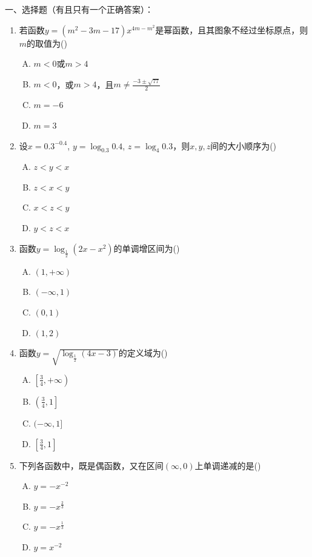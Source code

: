 一、选择题（有且只有一个正确答案）：
\begin{enumerate}
    \item 若函数$y=(m^2-3m-17)x^{4m-m^2}$是幂函数，且其图象不经过坐标原点，则$m$的取值为\hfill (\qquad )
\begin{enumerate}[(A)]
    \item $m<0$或$m>4$
    \item $m<0$，或$m>4$，且$m\ne \frac{-3\pm\sqrt{77}}{2}$
    \item $m=-6$
    \item $m=3$
\end{enumerate}

\item 设$x=0.3^{-0.4}$, $y=\log_{0.3}0.4$, $z=\log_4 0.3$，则$x,y,z$间的大小顺序为\hfill (\qquad )
\begin{multicols}{4}
\begin{enumerate}[(A)]
    \item $z<y<x$
    \item $z<x<y$
    \item $x<z<y$
    \item $y<z<x$
\end{enumerate}
\end{multicols}

\item 函数$y=\log_{\tfrac{1}{2}}(2x-x^2)$的单调增区间为\hfill (\qquad )
\begin{multicols}{4}
\begin{enumerate}[(A)]
    \item $(1,+\infty)$
    \item $(-\infty,1)$
    \item $(0,1)$
    \item $(1,2)$
\end{enumerate}
\end{multicols}

\item 函数$y=\sqrt{\log_{\tfrac{1}{2}}(4x-3)}$的定义域为\hfill (\qquad )
\begin{multicols}{4}
\begin{enumerate}[(A)]
    \item $\left[\frac{3}{4},+\infty\right)$
    \item $\left(\frac{3}{4},1\right]$
    \item $(-\infty,1]$
    \item $\left[\frac{3}{4},1 \right]$
\end{enumerate}
\end{multicols}

\item 下列各函数中，既是偶函数，又在区间$(\infty,0)$上单调递减的是\hfill (\qquad )
\begin{multicols}{4}
\begin{enumerate}[(A)]
    \item $y=-x^{-2}$
    \item $y=-x^{\tfrac{2}{3}}$
    \item $y=-x^{\tfrac{1}{3}}$
    \item $y=x^{-2}$
\end{enumerate}
\end{multicols}
\end{enumerate}

